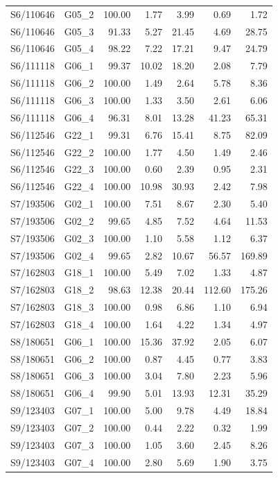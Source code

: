 \begin{longtable}{llrrrrr}
S6/110646 & G05\_2 & 100.00 & 1.77 & 3.99 & 0.69 & 1.72 \\
S6/110646 & G05\_3 & 91.33 & 5.27 & 21.45 & 4.69 & 28.75 \\
S6/110646 & G05\_4 & 98.22 & 7.22 & 17.21 & 9.47 & 24.79 \\
S6/111118 & G06\_1 & 99.37 & 10.02 & 18.20 & 2.08 & 7.79 \\
S6/111118 & G06\_2 & 100.00 & 1.49 & 2.64 & 5.78 & 8.36 \\
S6/111118 & G06\_3 & 100.00 & 1.33 & 3.50 & 2.61 & 6.06 \\
S6/111118 & G06\_4 & 96.31 & 8.01 & 13.28 & 41.23 & 65.31 \\
S6/112546 & G22\_1 & 99.31 & 6.76 & 15.41 & 8.75 & 82.09 \\
S6/112546 & G22\_2 & 100.00 & 1.77 & 4.50 & 1.49 & 2.46 \\
S6/112546 & G22\_3 & 100.00 & 0.60 & 2.39 & 0.95 & 2.31 \\
S6/112546 & G22\_4 & 100.00 & 10.98 & 30.93 & 2.42 & 7.98 \\
S7/193506 & G02\_1 & 100.00 & 7.51 & 8.67 & 2.30 & 5.40 \\
S7/193506 & G02\_2 & 99.65 & 4.85 & 7.52 & 4.64 & 11.53 \\
S7/193506 & G02\_3 & 100.00 & 1.10 & 5.58 & 1.12 & 6.37 \\
S7/193506 & G02\_4 & 99.65 & 2.82 & 10.67 & 56.57 & 169.89 \\
S7/162803 & G18\_1 & 100.00 & 5.49 & 7.02 & 1.33 & 4.87 \\
S7/162803 & G18\_2 & 98.63 & 12.38 & 20.44 & 112.60 & 175.26 \\
S7/162803 & G18\_3 & 100.00 & 0.98 & 6.86 & 1.10 & 6.94 \\
S7/162803 & G18\_4 & 100.00 & 1.64 & 4.22 & 1.34 & 4.97 \\
S8/180651 & G06\_1 & 100.00 & 15.36 & 37.92 & 2.05 & 6.07 \\
S8/180651 & G06\_2 & 100.00 & 0.87 & 4.45 & 0.77 & 3.83 \\
S8/180651 & G06\_3 & 100.00 & 3.04 & 7.80 & 2.23 & 5.96 \\
S8/180651 & G06\_4 & 99.90 & 5.01 & 13.93 & 12.31 & 35.29 \\
S9/123403 & G07\_1 & 100.00 & 5.00 & 9.78 & 4.49 & 18.84 \\
S9/123403 & G07\_2 & 100.00 & 0.44 & 2.22 & 0.32 & 1.99 \\
S9/123403 & G07\_3 & 100.00 & 1.05 & 3.60 & 2.45 & 8.26 \\
S9/123403 & G07\_4 & 100.00 & 2.80 & 5.69 & 1.90 & 3.75 \\

\end{longtable}
